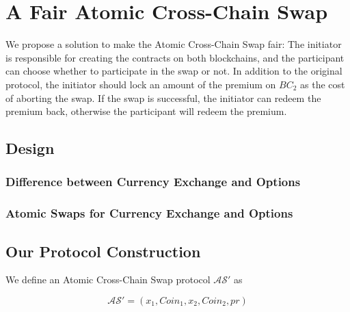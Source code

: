 \section{A Fair Atomic Cross-Chain Swap}
\label{sec:fair_atomic_swap}

We propose a solution to make the Atomic Cross-Chain Swap fair: 
The initiator is responsible for creating the contracts on both blockchains,
and the participant can choose whether to participate in the swap or not.
In addition to the original protocol, the initiator should lock an amount of the premium on $BC_2$ as the cost of aborting the swap.
If the swap is successful, the initiator can redeem the premium back, otherwise the participant will redeem the premium.

\subsection{Design}

\subsubsection{Difference between Currency Exchange and Options}


\subsubsection{Atomic Swaps for Currency Exchange and Options}




\subsection{Our Protocol Construction}

We define an Atomic Cross-Chain Swap protocol $\mathcal{AS}'$ as

$$\mathcal{AS}' = (x_1, Coin_1, x_2, Coin_2, pr)$$

